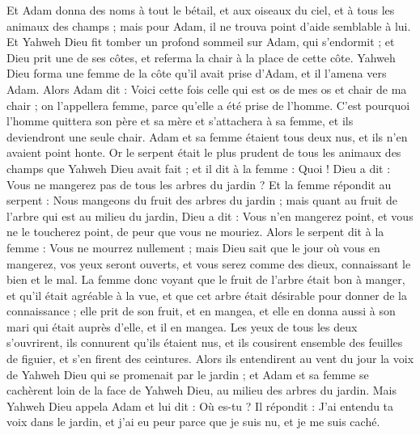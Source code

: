\begin{multicols}{2}
Et Adam donna des noms à tout le bétail, et aux oiseaux du ciel, et à tous les animaux des champs ; mais pour Adam, il ne trouva point d'aide semblable à lui.
Et Yahweh Dieu fit tomber un profond sommeil sur Adam, qui s'endormit ; et Dieu prit une de ses côtes, et referma la chair à la place de cette côte.
Yahweh Dieu forma une femme de la côte qu'il avait prise d'Adam, et il l'amena vers Adam.
Alors Adam dit : Voici cette fois celle qui est os de mes os et chair de ma chair ; on l'appellera femme, parce qu'elle a été prise de l'homme.
C'est pourquoi l'homme quittera son père et sa mère et s'attachera à sa femme, et ils deviendront une seule chair.
Adam et sa femme étaient tous deux nus, et ils n'en avaient point honte.
\VerseOne{}Or le serpent était le plus prudent de tous les animaux des champs que Yahweh Dieu avait fait ; et il dit à la femme : Quoi ! Dieu a dit : Vous ne mangerez pas de tous les arbres du jardin ?
Et la femme répondit au serpent : Nous mangeons du fruit des arbres du jardin ;
mais quant au fruit de l'arbre qui est au milieu du jardin, Dieu a dit : Vous n'en mangerez point, et vous ne le toucherez point, de peur que vous ne mouriez.
Alors le serpent dit à la femme : Vous ne mourrez nullement ;
mais Dieu sait que le jour où vous en mangerez, vos yeux seront ouverts, et vous serez comme des dieux, connaissant le bien et le mal.
La femme donc voyant que le fruit de l'arbre était bon à manger, et qu'il était agréable à la vue, et que cet arbre était désirable pour donner de la connaissance ; elle prit de son fruit, et en mangea, et elle en donna aussi à son mari qui était auprès d'elle, et il en mangea.
Les yeux de tous les deux s'ouvrirent, ils connurent qu'ils étaient nus, et ils cousirent ensemble des feuilles de figuier, et s'en firent des ceintures.
Alors ils entendirent au vent du jour la voix de Yahweh Dieu qui se promenait par le jardin ; et Adam et sa femme se cachèrent loin de la face de Yahweh Dieu, au milieu des arbres du jardin.
Mais Yahweh Dieu appela Adam et lui dit : Où es-tu ?
Il répondit : J'ai entendu ta voix dans le jardin, et j'ai eu peur parce que je suis nu, et je me suis caché.

\end{multicols}
